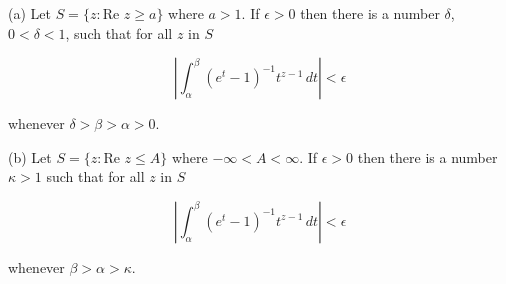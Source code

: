 (a) Let $S = \{z: \text{Re } z \geq a\}$ where $a > 1$. If $\epsilon > 0$ then there is a number $\delta$, $0 < \delta < 1$, such that for all $z$ in $S$

$$\left| \int_\alpha^\beta (e^t - 1)^{-1} t^{z-1} \, dt \right| < \epsilon$$

whenever $\delta > \beta > \alpha > 0$.

(b) Let $S = \{z: \text{Re } z \leq A\}$ where $-\infty < A < \infty$. If $\epsilon > 0$ then there is a number $\kappa > 1$ such that for all $z$ in $S$

$$\left| \int_\alpha^\beta (e^t - 1)^{-1} t^{z-1} \, dt \right| < \epsilon$$

whenever $\beta > \alpha > \kappa$.
